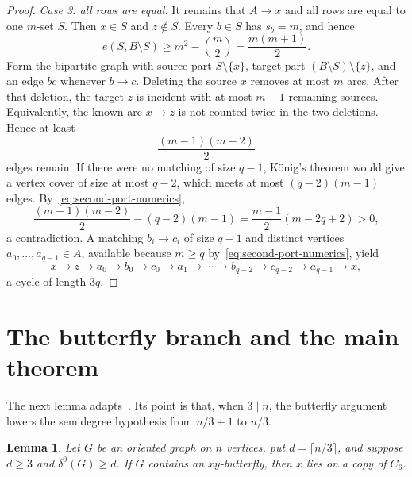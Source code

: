 \documentclass[11pt]{amsart}
\newtheorem{lemma}[theorem]{Lemma}
\theoremstyle{definition}
\begin{document}
\begin{proof}
\smallskip
\noindent\emph{Case 3: all rows are equal.}
It remains that $A\to x$ and all rows are equal to one $m$-set $S$.
Then $x\in S$ and $z\notin S$.  Every $b\in S$ has $s_b=m$, and hence
\[
  e(S,B\setminus S)
  \ge m^2-\binom m2
  =\frac{m(m+1)}2.
\]
Form the bipartite graph with source part $S\setminus\{x\}$, target
part $(B\setminus S)\setminus\{z\}$, and an edge $bc$ whenever
$b\to c$.  Deleting the source $x$ removes at most $m$ arcs.  After
that deletion, the target $z$ is incident with at most $m-1$ remaining
sources.  Equivalently, the known arc $x\to z$ is not counted twice in
the two deletions.  Hence at least
\[
  \frac{(m-1)(m-2)}2
\]
edges remain.  If there were no matching of size $q-1$, K\"onig's
theorem would give a vertex cover of size at most $q-2$, which meets at
most $(q-2)(m-1)$ edges.  By~\eqref{eq:second-port-numerics},
\[
  \frac{(m-1)(m-2)}2-(q-2)(m-1)
  =\frac{m-1}{2}(m-2q+2)>0,
\]
a contradiction.  A matching $b_i\to c_i$ of size $q-1$ and distinct
vertices $a_0,\ldots,a_{q-1}\in A$, available because $m\ge q$
by~\eqref{eq:second-port-numerics}, yield
\[
  x\to z\to a_0\to b_0\to c_0\to a_1\to\cdots
  \to b_{q-2}\to c_{q-2}\to a_{q-1}\to x,
\]
a cycle of length $3q$.
\end{proof}

\section{The butterfly branch and the main theorem}\label{sec:main-proof}

The next lemma adapts~\cite[Lemma~19]{KKO}.  Its point is that, when
$3\mid n$, the butterfly argument lowers the semidegree hypothesis from
$n/3+1$ to $n/3$.

\begin{lemma}\label{lem:butterfly-C6}
Let $G$ be an oriented graph on $n$ vertices, put
$d=\lceil n/3\rceil$, and suppose $d\ge3$ and $\delta^0(G)\ge d$.
If $G$ contains an $xy$-butterfly, then $x$ lies on a copy of $C_6$.
\end{lemma}
\end{document}
